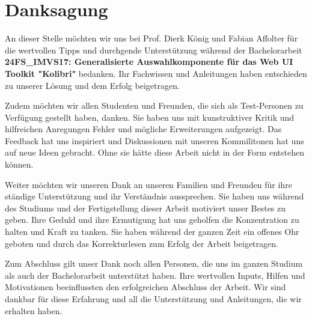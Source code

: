 \chapter*{Danksagung}

An dieser Stelle möchten wir uns bei Prof. Dierk König und Fabian Affolter für die wertvollen Tipps und durchgende Unterstützung 
während der Bachelorarbeit \textbf{24FS\_IMVS17: Generalisierte Auswahlkomponente für das Web UI Toolkit "Kolibri"} bedanken. 
Ihr Fachwissen und Anleitungen haben entschieden zu unserer Lösung und dem Erfolg beigetragen.

Zudem möchten wir allen Studenten und Freunden, die sich als Test-Personen zu Verfügung gestellt haben, danken.
Sie haben uns mit kunstruktiver Kritik und hilfreichen Anregungen Fehler und mögliche Erweiterungen aufgezeigt. 
Das Feedback hat uns inspiriert und Diskussionen mit unseren Kommilitonen hat uns auf neue Ideen gebracht.
Ohne sie hätte diese Arbeit nicht in der Form entstehen können.

Weiter möchten wir unseren Dank an unseren Familien und Freunden für ihre ständige Unterstützung und ihr Verständnis aussprechen.
Sie haben uns während des Studiums und der Fertigstellung dieser Arbeit motiviert unser Bestes zu geben. 
Ihre Geduld und ihre Ermutigung hat uns geholfen die Konzentration zu halten und Kraft zu tanken.
Sie haben während der ganzen Zeit ein offenes Ohr geboten und durch das Korrekturlesen zum Erfolg der Arbeit beigetragen.

Zum Abschluss gilt unser Dank noch allen Personen, die uns im ganzen Studium als auch der Bachelorarbeit unterstützt haben.
Ihre wertvollen Inputs, Hilfen und Motivationen beeinflussten den erfolgreichen Abschluss der Arbeit.
Wir sind dankbar für diese Erfahrung und all die Unterstützung und Anleitungen, die wir erhalten haben.
